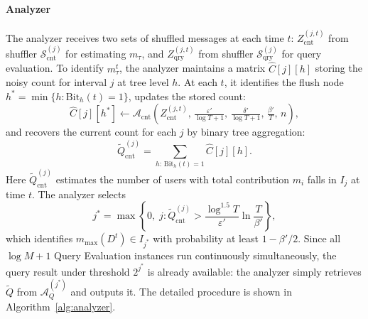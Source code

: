 \paragraph{Analyzer}
The analyzer receives two sets of shuffled messages at each time $t$: $Z^{(j,t)}_\mathrm{cnt}$ from shuffler $\mathcal{S}^{(j)}_\mathrm{cnt}$ for estimating $m_\tau$, and $Z^{(j,t)}_\mathrm{qry}$ from shuffler $\mathcal{S}^{(j)}_\mathrm{qry}$ for query evaluation.
To identify $m_\tau^t$, the analyzer maintains a matrix $\hat{C}[j][h]$ storing the noisy count for interval $j$ at tree level $h$. 
At each $t$, it identifies the flush node $h^* = \min\{h : \mathrm{Bit}_h(t) = 1\}$, updates the stored count:
$$\hat{C}[j][h^*] \leftarrow \mathcal{A}_{\mathrm{cnt}}\!\left(Z_{\mathrm{cnt}}^{(j,t)},\, \tfrac{\varepsilon'}{\log T+1},\, \tfrac{\delta'}{\log T+1},\, \tfrac{\beta'}{T},\, n\right),$$
and recovers the current count for each $j$ by binary tree aggregation:
$$\tilde{Q}_{\mathrm{cnt}}^{(j)} = \sum_{h:\,\mathrm{Bit}_h(t)=1} \hat{C}[j][h].$$
Here $\tilde{Q}_{\mathrm{cnt}}^{(j)}$ estimates the number of users with total contribution $m_i$ falls in $I_j$ at time $t$. 
The analyzer selects $$j^* = \max\!\left\{0,\; j : \tilde{Q}_{\mathrm{cnt}}^{(j)} > \frac{\log^{1.5} T}{\varepsilon'}\ln\frac{T}{\beta'}\right\},$$
which identifies $m_{\max}(D^t) \in I_{j^*}$ with probability at least $1 - \beta'/2$.
Since all $\log M + 1$ Query Evaluation instances run continuously simultaneously, the query result under threshold $2^{j^*}$ is already available: the analyzer simply retrieves $\tilde{Q}$ from $\mathcal{A}_Q^{(j^*)}$ and outputs it.
The detailed procedure is shown in Algorithm~\ref{alg:analyzer}.






